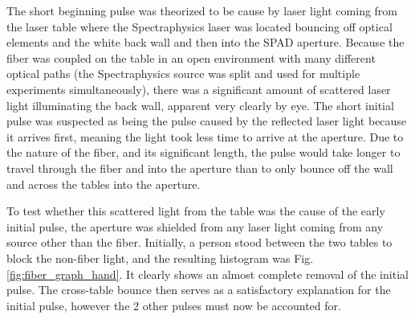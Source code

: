 \documentclass[a4paper]{article}
\begin{document}
The short beginning pulse was theorized to be cause by laser light coming from the laser table where the Spectraphysics laser was located bouncing off optical elements and the white back wall and then into the SPAD aperture. Because the fiber was coupled on the table in an open environment with many different optical paths (the Spectraphysics source was split and used for multiple experiments simultaneously), there was a significant amount of scattered laser light illuminating the back wall, apparent very clearly by eye. The short initial pulse was suspected as being the pulse caused by the reflected laser light because it arrives first, meaning the light took less time to arrive at the aperture. Due to the nature of the fiber, and its significant length, the pulse would take longer to travel through the fiber and into the aperture than to only bounce off the wall and across the tables into the aperture.

To test whether this scattered light from the table was the cause of the early initial pulse, the aperture was shielded from any laser light coming from any source other than the fiber. Initially, a person stood between the two tables to block the non-fiber light, and the resulting histogram was Fig.\ref{fig:fiber_graph_hand}. It clearly shows an almost complete removal of the initial pulse. The cross-table bounce then serves as a satisfactory explanation for the initial pulse, however the 2 other pulses must now be accounted for.


%
%
\end{document}
